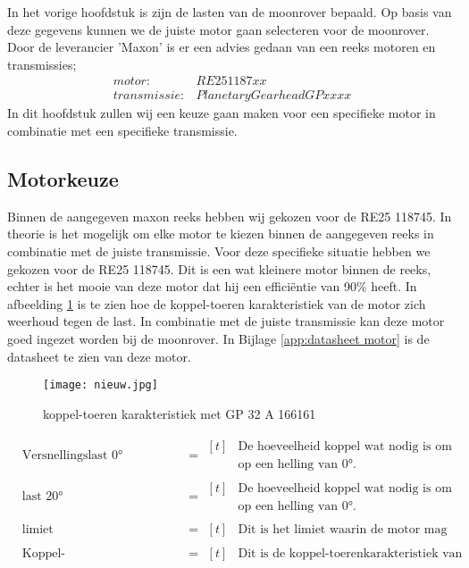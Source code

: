 In het vorige hoofdstuk is zijn de lasten van de moonrover bepaald. Op basis van deze gegevens kunnen we de juiste motor gaan selecteren voor de moonrover. Door de leverancier 'Maxon' is er een advies gedaan van een reeks motoren en transmissies;
\begin{align*}
        motor: &RE25 1187xx\\
        transmissie: &Planetary Gearhead GP xx xx
\end{align*}
In dit hoofdstuk zullen wij een keuze gaan maken voor een specifieke motor in combinatie met een specifieke transmissie.


\subsection{Motorkeuze}
Binnen de aangegeven maxon reeks hebben wij gekozen voor de RE25 118745. In theorie is het mogelijk om elke motor te kiezen binnen de aangegeven reeks in combinatie met de juiste transmissie. Voor deze specifieke situatie hebben we gekozen voor de RE25 118745. Dit is een wat kleinere motor binnen de reeks, echter is het mooie van deze motor dat hij een efficiëntie van 90\% heeft. In afbeelding \ref{fig:motor} is te zien hoe de koppel-toeren karakteristiek van de motor zich weerhoud tegen de last. In combinatie met de juiste transmissie kan deze motor goed ingezet worden bij de moonrover. In Bijlage \ref{app:datasheet motor} is de datasheet te zien van deze motor.
\begin{figure}[H]
        \centering
        \texttt{[image: nieuw.jpg]}
        \caption{koppel-toeren karakteristiek met GP 32 A 166161}
        \label{fig:motor}
\end{figure}

\begin{align*}
        & \text{Versnellingslast 0°} &&= \begin{aligned}[t] & \text{De hoeveelheid koppel wat nodig is om maximaal te versnellen} \\ & \text{op een helling van 0°.} \end{aligned}\\
        & \text{last 20°} &&= \begin{aligned}[t] & \text{De hoeveelheid koppel wat nodig is om stil te blijven staan} \\ & \text{op een helling van 0°.} \end{aligned}\\
        & \text{limiet} &&= \begin{aligned}[t] & \text{Dit is het limiet waarin de motor mag opereren.} \end{aligned}\\
        & \text{Koppel-toerenkarakteristiek motor} &&= \begin{aligned}[t] & \text{Dit is de koppel-toerenkarakteristiek van de motor.} \end{aligned}
    \end{align*}

